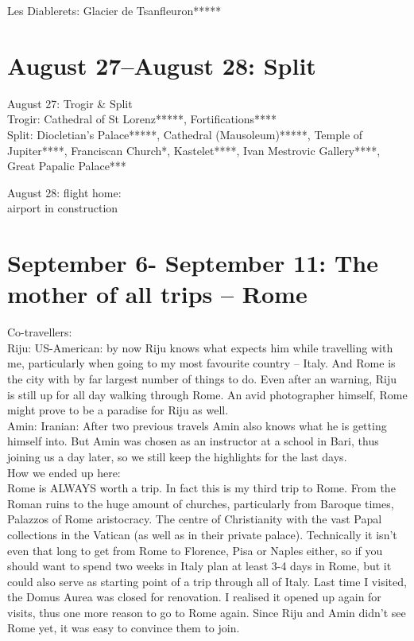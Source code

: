Les Diablerets: Glacier de Tsanfleuron*****

\section{August 27--August 28: Split}
\label{split2017}

August 27: Trogir \& Split\\
Trogir: Cathedral of St Lorenz*****, Fortifications****\\
Split: Diocletian's Palace*****, Cathedral (Mausoleum)*****, Temple of Jupiter****, Franciscan Church*, Kastelet****, Ivan Mestrovic Gallery****, Great Papalic Palace***

August 28: flight home:\\
airport in construction

\section{September 6- September 11: The mother of all trips -- Rome}
\label{2017:Rome}

Co-travellers:\\
Riju: US-American: by now Riju knows what expects him while travelling with me, particularly when going to my most favourite country -- Italy. And Rome is the city with by far largest number of things to do. Even after an warning, Riju is still up for all day walking through Rome. An avid photographer himself, Rome might prove to be a paradise for Riju as well.\\
Amin: Iranian: After two previous travels Amin also knows what he is getting himself into. But Amin was chosen as an instructor at a school in Bari, thus joining us a day later, so we still keep the highlights for the last days.\\

How we ended up here:\\
Rome is ALWAYS worth a trip. In fact this is my third trip to Rome. From the Roman ruins to the huge amount of churches, particularly from Baroque times, Palazzos of Rome aristocracy. The centre of Christianity with the vast Papal collections in the Vatican (as well as in their private palace). Technically it isn't even that long to get from Rome to Florence, Pisa or Naples either, so if you should want to spend two weeks in Italy plan at least 3-4 days in Rome, but it could also serve as starting point of a trip through all of Italy. Last time I visited, the Domus Aurea was closed for renovation. I realised it opened up again for visits, thus one more reason to go to Rome again. Since Riju and Amin didn't see Rome yet, it was easy to convince them to join.\\

